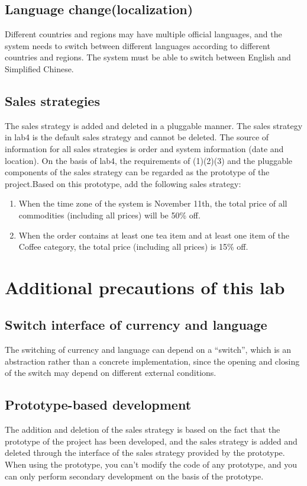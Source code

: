 \documentclass[a4paper]{report}
\begin{document}
\subsection{Language change(localization)}
Different countries and regions may have multiple official languages, and the system needs to switch between different languages according to different countries and regions. The system must be able to switch between English and Simplified Chinese.
\subsection{Sales strategies}
The sales strategy is added and deleted in a pluggable manner. The sales strategy in lab4 is the default sales strategy and cannot be deleted. The source of information for all sales strategies is order and system information (date and location). On the basis of lab4, the requirements of (1)(2)(3) and the pluggable components of the sales strategy can be regarded as the prototype of the project.Based on this prototype, add the following sales strategy:
\begin{enumerate}
\item
When the time zone of the system is November 11th, the total price of all commodities (including all prices) will be 50\% off.
\item
When the order contains at least one tea item and at least one item of the Coffee category, the total price (including all prices) is 15\% off.
\end{enumerate}

\section{Additional precautions of this lab}
\subsection{Switch interface of currency and language}
The switching of currency and language can depend on a ``switch'', which is an abstraction rather than a concrete implementation, since the opening and closing of the switch may depend on different external conditions.
\subsection{Prototype-based development}
The addition and deletion of the sales strategy is based on the fact that the prototype of the project has been developed, and the sales strategy is added and deleted through the interface of the sales strategy provided by the prototype. When using the prototype, you can't modify the code of any prototype, and you can only perform secondary development on the basis of the prototype.
\end{document}
